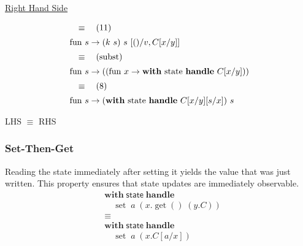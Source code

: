 \documentclass[logo,bsc,singlespacing,parskip]{infthesis}
\begin{document}
\underline{Right Hand Side}

\[ 
\begin{array}{l}
\quad\equiv\quad (11) \\[5pt]
\text{fun } s \rightarrow (k\ s)\ s\ [()/v, C[x/y]] \\[5pt]
\quad\equiv\quad (\text{subst}) \\[5pt]
\text{fun } s \rightarrow ((\text{fun } x \rightarrow \text{\textbf{with} state \textbf{handle} } C[x/y])) \\[5pt]
\quad\equiv\quad (8) \\[5pt]
\text{fun } s \rightarrow (\text{\textbf{with} state \textbf{handle} } C[x/y][s/x])\ s
\end{array}
\]

LHS $\equiv$ RHS



\subsubsection*{Set-Then-Get}
Reading the state immediately after setting it yields the value that was just written. This property ensures that state updates are immediately observable.
\[
\begin{aligned}
    &\mathsf{\textbf{with}} \; \mathsf{state} \; \mathsf{\textbf{handle}} \\
    &\quad \operatorname{set} \; a \; (x. \operatorname{get}() \; (y. C)) \\
    &\equiv \\
    &\mathsf{\textbf{with}} \; \mathsf{state} \; \mathsf{\textbf{handle}} \\
    &\quad \operatorname{set} \; a \; (x. C[a/x])
\end{aligned}
\]
\end{document}
